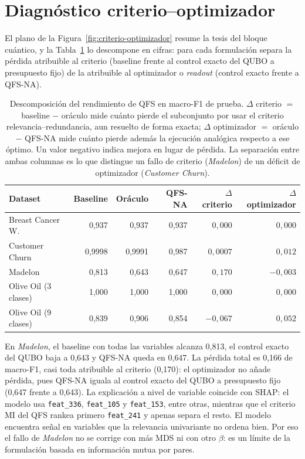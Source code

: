 \section{Diagnóstico criterio--optimizador}
\label{sec:diagnostico-qfs}

El plano de la Figura~\ref{fig:criterio-optimizador} resume la tesis
del bloque cuántico, y la Tabla~\ref{tab:atribucion} lo descompone en
cifras: para cada formulación separa la pérdida atribuible al criterio
(baseline frente al control exacto del QUBO a presupuesto fijo) de la
atribuible al optimizador o \textit{readout} (control exacto frente a
QFS-NA).

\begin{table}[!htbp]
  \centering
  \caption[Atribución criterio--optimizador]{Descomposición del
    rendimiento de QFS en macro-F1 de prueba. $\Delta$ criterio
    $=$ baseline $-$ oráculo mide cuánto pierde el subconjunto por usar el
    criterio relevancia--redundancia, aun resuelto de forma exacta;
    $\Delta$ optimizador $=$ oráculo $-$ QFS-NA mide cuánto pierde además
    la ejecución analógica respecto a ese óptimo. Un valor negativo indica
    mejora en lugar de pérdida. La separación entre ambas columnas es lo
    que distingue un fallo de criterio (\textit{Madelon}) de un déficit de
    optimizador (\textit{Customer Churn}).}
  \label{tab:atribucion}
  \small
  \begin{tabular}{lrrrrr}
    \toprule
    Dataset & Baseline & Oráculo & QFS-NA &
    $\Delta$ criterio & $\Delta$ optimizador \\
    \midrule
    Breast Cancer W. & 0{,}937 & 0{,}937 & 0{,}937 & $0{,}000$ & $0{,}000$ \\
    Customer Churn & 0{,}9998 & 0{,}9991 & 0{,}987 & $0{,}0007$ & $0{,}012$ \\
    Madelon & 0{,}813 & 0{,}643 & 0{,}647 & $0{,}170$ & $-0{,}003$ \\
    Olive Oil (3 clases) & 1{,}000 & 1{,}000 & 1{,}000 & $0{,}000$ & $0{,}000$ \\
    Olive Oil (9 clases) & 0{,}839 & 0{,}906 & 0{,}854 & $-0{,}067$ & $0{,}052$ \\
    \bottomrule
  \end{tabular}
\end{table}
\FloatBarrier

En \textit{Madelon}, el baseline con todas las
variables alcanza 0{,}813, el control exacto del QUBO baja a 0{,}643 y
QFS-NA queda en 0{,}647. La pérdida total es 0{,}166 de macro-F1, casi toda
atribuible al criterio (0{,}170): el optimizador no añade pérdida, pues
QFS-NA iguala al control exacto del QUBO a presupuesto fijo (0{,}647 frente
a 0{,}643). La explicación a nivel de variable coincide con SHAP: el modelo usa
\texttt{feat\_336}, \texttt{feat\_105} y \texttt{feat\_153}, entre
otras, mientras que el criterio MI del QFS rankea primero
\texttt{feat\_241} y apenas separa el resto. El modelo encuentra señal
en variables que la relevancia univariante no ordena bien. Por eso el
fallo de \textit{Madelon} no se corrige con más MDS ni con otro
$\beta$: es un límite de la formulación basada en información mutua por
pares.

